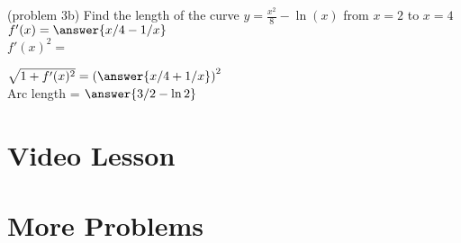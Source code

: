 \documentclass{ximera}
\begin{document}
\begin{problem}(problem 3b)
Find the length of the curve $\displaystyle{y = \frac{x^2}{8} - \ln(x)}$ from $x = 2$ to $x = 4$\\

$f'(x) = \answer{x/4 - 1/x}$\\

$f'(x)^2 =$

\begin{multipleChoice}
\end{multipleChoice}

$\sqrt{1+f'(x)^2} = \left(\answer{x/4 + 1/x}\right)^2$\\

Arc length = $\answer{3/2 - \ln 2}$
\end{problem}




\section{Video Lesson}


\begin{center}
\begin{foldable}
\end{foldable}
\end{center}

\section{More Problems}
\end{document}
